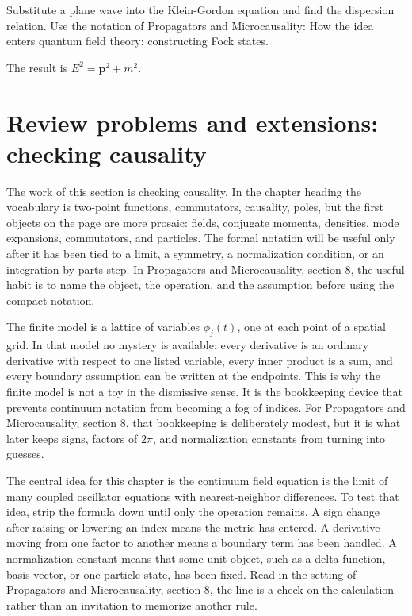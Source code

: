 \begin{exercise}
Substitute a plane wave into the Klein-Gordon equation and find the dispersion relation.  Use the notation of Propagators and Microcausality: How the idea enters quantum field theory: constructing Fock states.
\begin{answer}
The result is \(E^2=\bm p^2+m^2\).
\end{answer}
\end{exercise}



\section{Review problems and extensions: checking causality}

The work of this section is checking causality.  In the chapter heading the vocabulary is two-point functions, commutators, causality, poles, but the first objects on the page are more prosaic: fields, conjugate momenta, densities, mode expansions, commutators, and particles.  The formal notation will be useful only after it has been tied to a limit, a symmetry, a normalization condition, or an integration-by-parts step.  In Propagators and Microcausality, section 8, the useful habit is to name the object, the operation, and the assumption before using the compact notation.

The finite model is a lattice of variables \(\phi_j(t)\), one at each point of a spatial grid.  In that model no mystery is available: every derivative is an ordinary derivative with respect to one listed variable, every inner product is a sum, and every boundary assumption can be written at the endpoints.  This is why the finite model is not a toy in the dismissive sense.  It is the bookkeeping device that prevents continuum notation from becoming a fog of indices.  For Propagators and Microcausality, section 8, that bookkeeping is deliberately modest, but it is what later keeps signs, factors of \(2\pi\), and normalization constants from turning into guesses.

The central idea for this chapter is the continuum field equation is the limit of many coupled oscillator equations with nearest-neighbor differences.  To test that idea, strip the formula down until only the operation remains.  A sign change after raising or lowering an index means the metric has entered.  A derivative moving from one factor to another means a boundary term has been handled.  A normalization constant means that some unit object, such as a delta function, basis vector, or one-particle state, has been fixed.  Read in the setting of Propagators and Microcausality, section 8, the line is a check on the calculation rather than an invitation to memorize another rule.

